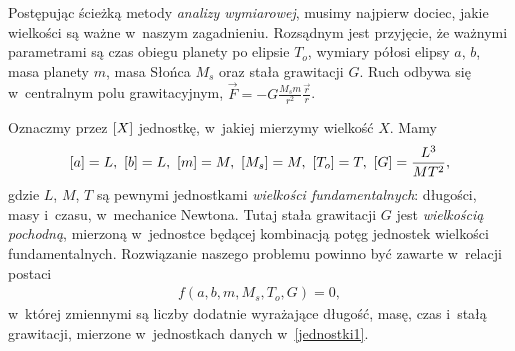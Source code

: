  
Postępując ścieżką metody {\it analizy wymiarowej},  
musimy najpierw dociec, jakie wielkości są ważne w~naszym zagadnieniu. Rozsądnym jest przyjęcie, że ważnymi parametrami są czas obiegu planety po elipsie $T_o$, wymiary półosi elipsy $a$, $b$, masa planety $m$, masa Słońca $M_s$ oraz stała grawitacji $G$. Ruch odbywa się w~centralnym polu grawitacyjnym, 
$\vec{F} = -G\frac{M_s m}{r^2}\frac{\vec{r}}{r}$.
 
Oznaczmy przez $[X]$ jednostkę, w~jakiej mierzymy wielkość $X$. 
Mamy
\begin{eqnarray}\label{jednostki1}
 \uunit{a}=L, \ \uunit{b}=L, \ \uunit{m}=M, \ \uunit{M_s}=M, \ 
\uunit{T_o}=T, \ \uunit{G}=\frac{L^3}{MT^2},
\end{eqnarray}
gdzie $L$, $M$, $T$ są pewnymi jednostkami 
{\it wielkości fundamentalnych}: długości, masy i~czasu, w~mechanice Newtona. Tutaj stała grawitacji $G$ jest {\it wielkością pochodną}, mierzoną w~jednostce będącej kombinacją potęg jednostek wielkości fundamentalnych.
Rozwiązanie naszego problemu powinno być zawarte w~relacji postaci 
\begin{eqnarray}\label{formuła1}
 f(a, b, m, M_s, T_o, G)=0,
\end{eqnarray}
w~której zmiennymi są liczby dodatnie wyrażające długość, masę, czas i~stałą grawitacji, mierzone w~jednostkach danych w~\eqref{jednostki1}.


